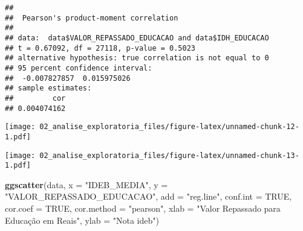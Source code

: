 \documentclass[
]{article}
\newenvironment{Shaded}{\begin{snugshade}}{\end{snugshade}}
\newcommand{\CommentTok}[1]{\textcolor[rgb]{0.56,0.35,0.01}{\textit{#1}}}
\newcommand{\DataTypeTok}[1]{\textcolor[rgb]{0.13,0.29,0.53}{#1}}
\newcommand{\KeywordTok}[1]{\textcolor[rgb]{0.13,0.29,0.53}{\textbf{#1}}}
\newcommand{\NormalTok}[1]{#1}
\newcommand{\OperatorTok}[1]{\textcolor[rgb]{0.81,0.36,0.00}{\textbf{#1}}}
\newcommand{\OtherTok}[1]{\textcolor[rgb]{0.56,0.35,0.01}{#1}}
\newcommand{\StringTok}[1]{\textcolor[rgb]{0.31,0.60,0.02}{#1}}
\begin{document}
\begin{verbatim}
## 
##  Pearson's product-moment correlation
## 
## data:  data$VALOR_REPASSADO_EDUCACAO and data$IDH_EDUCACAO
## t = 0.67092, df = 27118, p-value = 0.5023
## alternative hypothesis: true correlation is not equal to 0
## 95 percent confidence interval:
##  -0.007827857  0.015975026
## sample estimates:
##         cor 
## 0.004074162
\end{verbatim}

\begin{Shaded}
\end{Shaded}

\texttt{[image: 02\_analise\_exploratoria\_files/figure-latex/unnamed-chunk-12-1.pdf]}

\begin{Shaded}
\end{Shaded}

\texttt{[image: 02\_analise\_exploratoria\_files/figure-latex/unnamed-chunk-13-1.pdf]}

\begin{Shaded}
\begin{Highlighting}[]
\KeywordTok{ggscatter}\NormalTok{(data, }\DataTypeTok{x =} \StringTok{"IDEB\_MEDIA"}\NormalTok{, }\DataTypeTok{y =} \StringTok{"VALOR\_REPASSADO\_EDUCACAO"}\NormalTok{, }
          \DataTypeTok{add =} \StringTok{"reg.line"}\NormalTok{, }\DataTypeTok{conf.int =} \OtherTok{TRUE}\NormalTok{, }
          \DataTypeTok{cor.coef =} \OtherTok{TRUE}\NormalTok{, }\DataTypeTok{cor.method =} \StringTok{"pearson"}\NormalTok{,}
          \DataTypeTok{xlab =} \StringTok{"Valor Repassado para Educação em Reais"}\NormalTok{, }\DataTypeTok{ylab =} \StringTok{"Nota ideb"}\NormalTok{)}
\end{Highlighting}
\end{Shaded}
\end{document}
